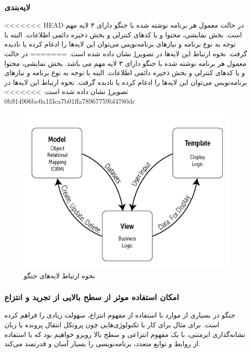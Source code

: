 {{\subsubsection{لایه‌بندی}
<<<<<<< HEAD
در حالت معمول هر برنامه نوشته شده با جنگو دارای ۳ لایه مهم است. بخش نمایشی، محتوا و یا کدهای کنترلی و بخش ذخیره دائمی اطلاعات. البته با توجه به نوع برنامه و نیاز‌های برنامه‌نویس می‌توان این لایه‌ها را ادغام کرده یا نادیده گرفت. نحوه ارتباط این لایه‌ها در تصویر\ref{mtv} نشان داده شده است.
=======
در حالت معمول هر برنامه نوشته شده با جنگو دارای ۳ لایه مهم می باشد. بخش نمایشی، محتوا و یا کدهای کنترلی و بخش ذخیره دائمی اطلاعات. البته با توجه به نوع برنامه و نیاز‌های برنامه‌نویس می‌توان این لایه‌ها را ادغام کرده یا نادیده گرفت. نحوه ارتباط این لایه‌ها در تصویر\ref{mtv} نشان داده شده است.
>>>>>>> 0b914906bc0a1f3ca7b01ffa78967759bf4780dc
 
\begin{figure}[t!]
    \centering
    \includegraphics[scale=0.75]{figures/mtv.png}
    \caption{نحوه ارتباط لایه‌های جنگو}
    \label{mtv}
\end{figure}


\subsubsection{امکان استفاده موثر از سطح بالایی از تجرید و انتزاع}
جنگو در بسیاری از موارد با استفاده از مفهوم انتزاع، سهولت زیادی را فراهم کرده است. برای مثال برای کار با تکنولوژی‌هایی چون پروتکل انتقال پرونده یا زبان نشانه‌گذاری ابرمتنی، با یک مفهوم انتزاعی و سطح بالا روبرو خواهیم بود که با استفاده از روابط و توابع متعدد، برنامه‌نویسی را بسیار آسان و قدرتمند می‌کند.
 
}}

